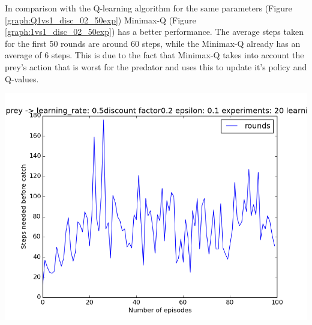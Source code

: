 In comparison with the Q-learning algorithm for the same parameters (Figure \ref{graph:Q1vs1_disc_02_50exp}) Minimax-Q (Figure  \ref{graph:1vs1_disc_02_50exp}) has a better performance. The average steps taken for the first 50 rounds are around 60 steps, while the Minimax-Q already has an average of 6 steps. This is due to the fact that Minimax-Q takes into account the prey's action that is worst for the predator and uses this to update it's policy and Q-values.

\begin{center}
	\includegraphics[scale=0.3]{qlearning_100rounds_20exp_disc02_alpha05}
	\label{graph:Q1vs1_disc_02_50exp}
\end{center}
